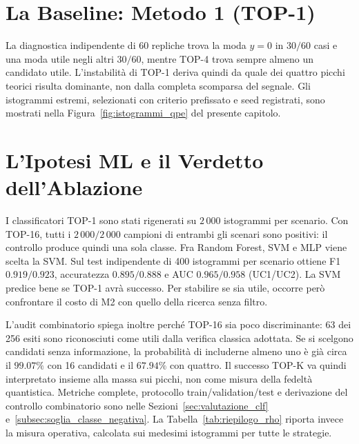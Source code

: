 \begin{onehalfspace}
\section{La Baseline: Metodo 1 (TOP-1)}
\label{sec:risultati_uc_m1}
\label{sec:analisi_m1}
\label{sec:uc1_m1}
\label{sec:uc2_m1}

La diagnostica indipendente di 60 repliche trova la moda $y=0$ in
$30/60$ casi e una moda utile negli altri $30/60$, mentre TOP-4 trova
sempre almeno un candidato utile. L'instabilità di TOP-1 deriva quindi da
quale dei quattro picchi teorici risulta dominante, non dalla completa
scomparsa del segnale. Gli istogrammi estremi, selezionati con criterio
prefissato e seed registrati, sono mostrati nella
Figura~\ref{fig:istogrammi_qpe} del presente capitolo.

\section{L'Ipotesi ML e il Verdetto dell'Ablazione}
\label{sec:confronto}
\label{sec:uc1_m2}
\label{sec:uc2_m2}

I classificatori TOP-1 sono stati rigenerati su $2\,000$ istogrammi per scenario. Con TOP-16, tutti i $2\,000/2\,000$ campioni di entrambi gli scenari sono positivi: il controllo produce quindi una sola classe. Fra Random Forest, SVM e MLP viene scelta la SVM. Sul test indipendente di 400 istogrammi per scenario ottiene F1 $0.919/0.923$, accuratezza $0.895/0.888$ e AUC $0.965/0.958$ (UC1/UC2). La SVM predice bene se TOP-1 avrà successo. Per stabilire se sia utile, occorre però confrontare il costo di M2 con quello della ricerca senza filtro.

L'audit combinatorio spiega inoltre perché TOP-16 sia poco discriminante:
63 dei 256 esiti sono riconosciuti come utili dalla verifica classica
adottata. Se si scelgono candidati senza informazione, la probabilità di
includerne almeno uno è già circa il $99.07\%$ con 16 candidati e il
$67.94\%$ con quattro. Il successo TOP-K va quindi interpretato insieme
alla massa sui picchi, non come misura della fedeltà quantistica.
Metriche complete, protocollo train/validation/test e derivazione del
controllo combinatorio sono nelle Sezioni~\ref{sec:valutazione_clf}
e~\ref{subsec:soglia_classe_negativa}. La
Tabella~\ref{tab:riepilogo_rho} riporta invece la misura operativa,
calcolata sui medesimi istogrammi per tutte le strategie.


\end{onehalfspace}
